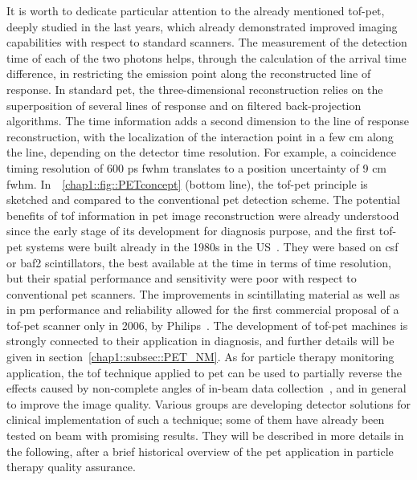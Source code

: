It is worth to dedicate particular attention to the already mentioned \gls{tof}-\gls{pet}, deeply studied in the last years, which already demonstrated improved imaging capabilities with respect to standard scanners. The measurement of the detection time of each of the two photons helps, through the calculation of the arrival time difference, in restricting the emission point along the reconstructed line of response. In standard \gls{pet}, the three-dimensional reconstruction relies on the superposition of several lines of response and on filtered back-projection algorithms. The time information adds a second dimension to the line of response reconstruction, with the localization of the interaction point in a few cm along the line, depending on the detector time resolution. For example, a coincidence timing resolution of 600 ps \gls{fwhm} translates to a position uncertainty of 9 cm \gls{fwhm}. In~\figurename~\ref{chap1::fig::PETconcept} (bottom line), the \gls{tof}-\gls{pet} principle is sketched and compared to the conventional \gls{pet} detection scheme. 
The potential benefits of \gls{tof} information in \gls{pet} image reconstruction were already understood since the early stage of its development for diagnosis purpose, and the first \gls{tof}-\gls{pet} systems were built already in the 1980s in the US~\parencite{Gariod1982}. They were based on \gls{csf} or \gls{baf2} scintillators, the best available at the time in terms of time resolution, but their spatial performance and sensitivity were poor with respect to conventional \gls{pet} scanners. The improvements in scintillating material as well as in \gls{pm} performance and reliability allowed for the first commercial proposal of a \gls{tof}-\gls{pet} scanner only in 2006, by Philips~\parencite{Surti2007}. The development of \gls{tof}-\gls{pet} machines is strongly connected to their application in diagnosis, and further details will be given in section~\ref{chap1::subsec::PET_NM}. As for particle therapy monitoring application, the \gls{tof} technique applied to \gls{pet} can be used to partially reverse the effects caused by non-complete angles of in-beam data collection~\parencite{Crespo2006}, and in general to improve the image quality. Various groups are developing detector solutions for clinical implementation of such a technique; some of them have already been tested on beam with promising results. They will be described in more details in the following, after a brief historical overview of the \gls{pet} application in particle therapy quality assurance. 

